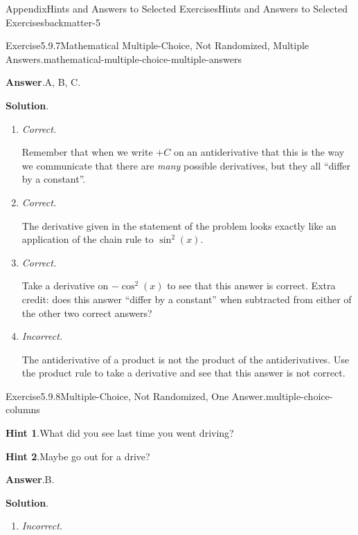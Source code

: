 \documentclass[oneside,10pt,]{book}
\newcommand{\blocktitlefont}{\relax}
\newcommand{\lititle}[1]{{\slshape#1}}
\numberwithin{equation}{section}
\begin{document}
\begin{solutions-chapter}{Appendix}{Hints and Answers to Selected Exercises}{}{Hints and Answers to Selected Exercises}{}{}{backmatter-5}
\begin{divisionsolution}{Exercise}{5.9.7}{Mathematical Multiple-Choice, Not Randomized, Multiple Answers.}{mathematical-multiple-choice-multiple-answers}
\par\smallskip%
\noindent\textbf{\blocktitlefont Answer}.\hypertarget{mathematical-multiple-choice-multiple-answers-5-back}{}\quad{}A, B, C.%
\par\smallskip%
\noindent\textbf{\blocktitlefont Solution}.\hypertarget{mathematical-multiple-choice-multiple-answers-6-back}{}\quad{}%
\begin{enumerate}[label={\Alph*.}]
\item{}\lititle{Correct.}\par%
Remember that when we write \(+C\) on an antiderivative that this is the way we communicate that there are \emph{many} possible derivatives, but they all ``differ by a constant''.%
\item{}\lititle{Correct.}\par%
The derivative given in the statement of the problem looks exactly like an application of the chain rule to \(\sin^2(x)\).%
\item{}\lititle{Correct.}\par%
Take a derivative on \(-\cos^2(x)\) to see that this answer is correct.  Extra credit: does this answer ``differ by a constant'' when subtracted from either of the other two correct answers?%
\item{}\lititle{Incorrect.}\par%
The antiderivative of a product is not the product of the antiderivatives.  Use the product rule to take a derivative and see that this answer is not correct.%
\end{enumerate}
%
\end{divisionsolution}%
\begin{divisionsolution}{Exercise}{5.9.8}{Multiple-Choice, Not Randomized, One Answer.}{multiple-choice-columns}%
\par\smallskip%
\noindent\textbf{\blocktitlefont Hint 1}.\hypertarget{multiple-choice-columns-4-back}{}\quad{}What did you see last time you went driving?%
\par\smallskip%
\noindent\textbf{\blocktitlefont Hint 2}.\hypertarget{multiple-choice-columns-5-back}{}\quad{}Maybe go out for a drive?%
\par\smallskip%
\noindent\textbf{\blocktitlefont Answer}.\hypertarget{multiple-choice-columns-6-back}{}\quad{}B.%
\par\smallskip%
\noindent\textbf{\blocktitlefont Solution}.\hypertarget{multiple-choice-columns-7-back}{}\quad{}%
\begin{enumerate}[label={\Alph*.}]
\item{}\lititle{Incorrect.}\par%

\end{enumerate}
\end{divisionsolution}
\end{solutions-chapter}
\end{document}
